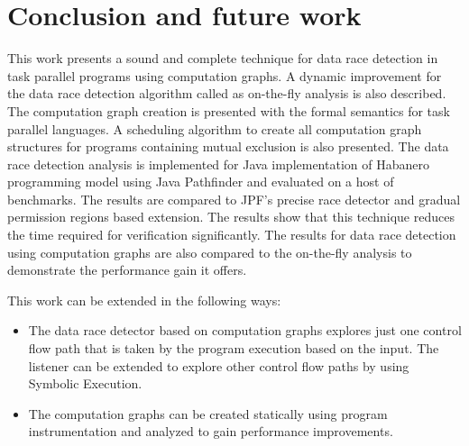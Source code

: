 \section{Conclusion and future work} \label{sec:conclusion}
This work presents a sound and complete technique for data race detection in task parallel programs using computation graphs. A dynamic improvement for the data race detection algorithm called as on-the-fly analysis is also described. The computation graph creation is presented with the formal semantics for task parallel languages. A scheduling algorithm to create all computation graph structures for programs containing mutual exclusion is also presented. The data race detection analysis is implemented for Java implementation of Habanero programming model using Java Pathfinder and evaluated on a host of benchmarks. The results are compared to JPF's precise race detector and gradual permission regions based extension. The results show that this technique reduces the time required for verification significantly. The results for data race detection using computation graphs are also compared to the on-the-fly analysis to demonstrate the performance gain it offers.

This work can be extended in the following ways:
\begin{itemize}
\item The data race detector based on computation graphs explores just one control flow path that is taken by the program execution based on the input. The listener can be extended to explore other control flow paths by using Symbolic Execution.
\item The computation graphs can be created statically using program instrumentation and analyzed to gain performance improvements.
\end{itemize}